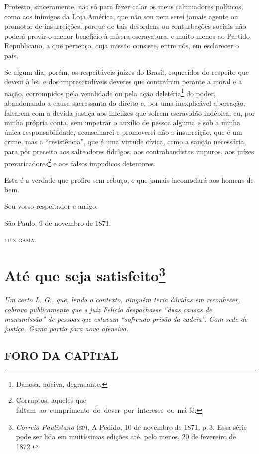 Protesto, sinceramente, não só para fazer calar os meus caluniadores
políticos, como aos inimigos da Loja América, que não sou nem serei
jamais agente ou promotor de insurreições, porque de tais desordens ou
conturbações sociais não poderá provir o menor benefício à mísera
escravatura, e muito menos ao Partido Republicano, a que pertenço, cuja
missão consiste, entre nós, em esclarecer o país.

Se algum dia, porém, os respeitáveis juízes do Brasil, esquecidos do
respeito que devem à lei, e dos imprescindíveis deveres que contraíram
perante a moral e a nação, corrompidos pela venalidade ou pela ação
deletéria\footnote{ Danosa, nociva, degradante.} do poder, abandonando
a causa sacrossanta do direito e, por uma inexplicável aberração,
faltarem com a devida justiça aos infelizes que sofrem escravidão
indébita, eu, por minha própria conta, sem impetrar o auxílio de pessoa
alguma e sob a minha única responsabilidade, aconselharei e promoverei
não a insurreição, que é um crime, mas a ``resistência'', que é uma
virtude cívica, como a sanção necessária, para pôr preceito aos
salteadores fidalgos, aos contrabandistas impuros, aos juízes
prevaricadores\footnote{ Corruptos, aqueles que
  faltam~ao~cumprimento~do~dever~por~interesse~ou~má-fé.} e aos falsos
impudicos detentores.

Esta é a verdade que profiro sem rebuço, e que jamais incomodará aos
homens de bem.

Sou vosso respeitador e amigo.

São Paulo, 9 de novembro de 1871.

\textsc{luiz gama}.

\chapter{Até que seja satisfeito\footnote{\emph{Correio Paulistano} (\textsc{sp}), A Pedido, 10 de novembro de 1871,
  p.\,3. Essa série pode ser lida em muitíssimas edições até, pelo menos,
  20 de fevereiro de 1872.}} %

\begin{didascalia}
\emph{Um certo L. G., que, lendo o contexto, ninguém teria dúvidas em
reconhecer, cobrava publicamente que o juiz Felicio despachasse ``duas
causas de manumissão'' de pessoas que estavam ``sofrendo prisão da
cadeia''. Com sede de justiça, Gama partia para nova ofensiva.}
\end{didascalia}


\section{FORO DA CAPITAL}

